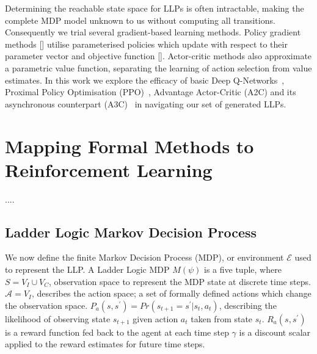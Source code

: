 \documentclass[conference,compsoc]{IEEEtran}
\begin{document}
Determining the reachable state space for LLPs is often intractable, making the complete MDP model unknown to us without computing all transitions. Consequently we trial several gradient-based learning methods. Policy gradient methods [] utilise parameterised policies which update with respect to their parameter vector and objective function []. Actor-critic methods also approximate a parametric value function, separating the learning of action selection from value estimates. In this work we explore the efficacy of basic Deep Q-Networks~\cite{mnih2013playing}, Proximal Policy Optimisation (PPO)~\cite{schulman2017proximal}, Advantage Actor-Critic (A2C) and its asynchronous counterpart (A3C)~\cite{mnih2016asynchronous} in navigating our set of generated LLPs.

\section{Mapping Formal Methods to Reinforcement Learning} \label{sec:mapping_fm_to_ml}
....


\subsection{Ladder Logic Markov Decision Process}\label{subsect:MDP}
We now define the finite Markov Decision Process (MDP), or environment $\mathcal{E}$ used to represent the LLP. A Ladder Logic MDP $M(\psi)$ is a five tuple, where $S = V_I \cup V_C$, observation space to represent the MDP state at discrete time steps. $\mathcal{A} = V_I$, describes the action space; a set of formally defined actions which change the observation space. $P_a(s,s^\prime) = Pr(s_{t+1} = s^\prime | s_t, a_t)$, describing the likelihood of observing state $s_{t+1}$ given action $a_t$ taken from state $s_t$. $R_a(s,s^\prime)$ is a reward function fed back to the agent at each time step $\gamma$ is a discount scalar applied to the reward estimates for future time steps.
\end{document}
